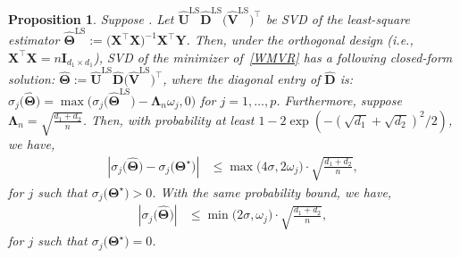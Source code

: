 \documentclass[12pt]{article}
\newtheorem{proposition}[theorem]{Proposition}
\begin{document}
\begin{proposition} \label{clsed-form}
    Suppose .
    Let $\widehat{\boldsymbol{U}}^{\text{LS}}\widehat{\boldsymbol{D}}^{\text{LS}}\big(\widehat{\boldsymbol{V}}^{\text{LS}}\big)^{\top}$ be SVD of the least-square estimator $\widehat{\boldsymbol{\Theta}}^{\text{LS}}:=\big(\boldsymbol{X}^{\top}\boldsymbol{X}\big)^{-1}\boldsymbol{X}^{\top}\boldsymbol{Y}$.
    Then, under the orthogonal design (i.e., $\boldsymbol{X}^{\top}\boldsymbol{X}=n\boldsymbol{I}_{d_{1} \times d_{1}}$), SVD of the minimizer of~\eqref{WMVR} has a following closed-form solution:
    $\widehat{\boldsymbol{\Theta}} := \widehat{\boldsymbol{U}}^{\text{LS}}\widehat{\boldsymbol{D}}\big(\widehat{\boldsymbol{V}}^{\text{LS}}\big)^{\top}$,
    where the diagonal entry of $\widehat{\boldsymbol{D}}$ is: 
    $\sigma_{j}\big(\widehat{\boldsymbol{\Theta}}\big) = \max \big(  \sigma_{j}\big(\widehat{\boldsymbol{\Theta}}^{\text{LS}}\big)-\boldsymbol{\Lambda}_{n} \omega_{j},0 \big)$ for $j=1,\dots,p$.
    Furthermore, suppose $\boldsymbol{\Lambda}_{n}=\sqrt{\frac{d_{1}+d_{2}}{n}}$.
    Then, with probability at least $1-2\exp(-(\sqrt{d_{1}}+\sqrt{d_{2}})^{2}/2)$, we have,
    \begin{align} \label{sing1}
        \left| \sigma_{j}\big(\widehat{\boldsymbol{\Theta}}\big)-\sigma_{j}\big(\boldsymbol{\Theta}^{\star}\big)\right|
        &\leq \max\big(4\sigma,2\omega_{j}\big)\cdot \sqrt{\frac{d_{1}+d_{2}}{n}},
    \end{align}
    for $j$ such that $\sigma_{j}\big(\boldsymbol{\Theta}^{\star}\big)>0$. 
    With the same probability bound, we have,
    \begin{align} \label{sing2}
        \left| \sigma_{j}\big(\widehat{\boldsymbol{\Theta}}\big)\right|
        &\leq \min\big(2\sigma,\omega_{j}\big)\cdot \sqrt{\frac{d_{1}+d_{2}}{n}},
    \end{align}
    for $j$ such that $\sigma_{j}\big(\boldsymbol{\Theta}^{\star}\big)=0$. 

\end{proposition}
\end{document}
